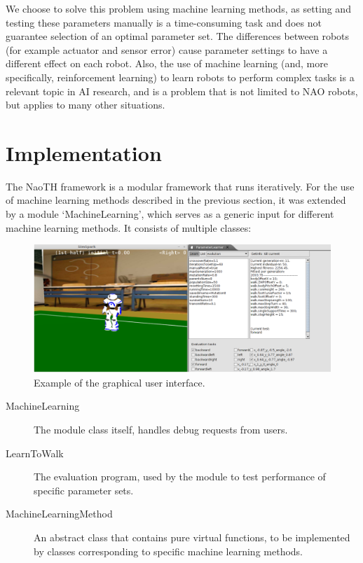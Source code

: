 \documentclass{article}
\begin{document}
We choose to solve this problem using machine learning methods, as setting and testing these parameters manually is a time-consuming task and does not guarantee selection of an optimal parameter set. The differences between robots (for example actuator and sensor error) cause parameter settings to have a different effect on each robot. Also, the use of machine learning (and, more specifically, reinforcement learning) to learn robots to perform complex tasks is a relevant topic in AI research, and is a problem that is not limited to NAO robots, but applies to many other situations. 


\section{Implementation}
The NaoTH framework is a modular framework that runs iteratively.  For the use of machine learning methods described in the previous section, it was extended by a module `MachineLearning', which serves as a generic input for different machine learning methods. It consists of multiple classes:

\begin{figure}
	\center
	\includegraphics[width=\textwidth]{images/GUI}
	\caption{Example of the graphical user interface.}
	\label{fig:gui}
\end{figure}

\begin{description}
\item[MachineLearning] The module class itself, handles debug requests from users.
\item[LearnToWalk] The evaluation program, used by the module to test performance of specific parameter sets.
\item[MachineLearningMethod] An abstract class that contains pure virtual functions, to be implemented by classes corresponding to specific machine learning methods.
\end{description}
\end{document}
